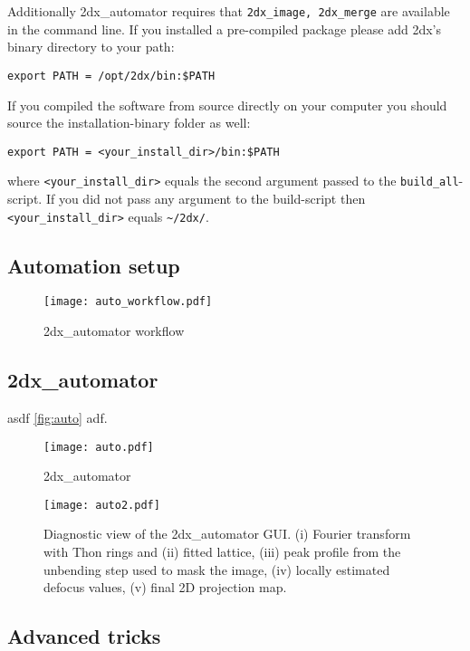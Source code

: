 Additionally 2dx\_automator requires that \texttt{2dx\_image, 2dx\_merge} are available in the command line. If you installed a pre-compiled package please add 2dx's binary directory to your path:

\texttt{export PATH = /opt/2dx/bin:\$PATH}

If you compiled the software from source directly on your computer you should source the installation-binary folder as well:

\texttt{export PATH = <your\_install\_dir>/bin:\$PATH}

where \texttt{<your\_install\_dir>} equals the second argument passed to the \texttt{build\_all}-script. If you did not pass any argument to the build-script then \texttt{<your\_install\_dir>} equals \texttt{\textasciitilde{}/2dx/}.

\subsection{Automation setup}

\begin{figure}
	\centering
	\texttt{[image: auto\_workflow.pdf]}
	\caption{2dx\_automator workflow}
	\label{fig:auto}
\end{figure}

\subsection{2dx\_automator}

asdf  \autoref{fig:auto} adf.

\begin{figure}
	\centering
	\texttt{[image: auto.pdf]}
	\caption{2dx\_automator}
	\label{fig:auto}
\end{figure}

\begin{figure}
	\centering
	\texttt{[image: auto2.pdf]}
	\caption{Diagnostic view of the 2dx\_automator GUI. (i) Fourier transform with Thon rings and (ii) fitted lattice, (iii) peak profile from the unbending step used to mask the image, (iv) locally estimated defocus values, (v) final 2D projection map.}
	\label{fig:auto2}
\end{figure}


\subsection{Advanced tricks}

